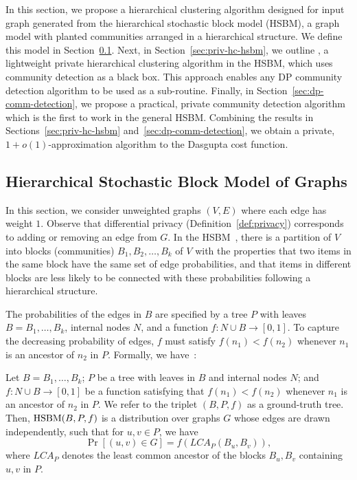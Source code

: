 
In this section, we propose a hierarchical clustering algorithm designed for input graph generated from the hierarchical stochastic block model (HSBM), a graph model with planted communities arranged in a hierarchical structure. We define this model in Section~\ref{sec:hsbm-setup}. Next, in Section~\ref{sec:priv-hc-hsbm}, we outline \dphcblocks{}, a lightweight private hierarchical clustering algorithm in the HSBM, which uses community detection as a black box. This approach enables any DP community detection algorithm to be used as a sub-routine. Finally, in Section~\ref{sec:dp-comm-detection}, we propose a practical, private community detection algorithm which is the first to work in the general HSBM. Combining the results in Sections~\ref{sec:priv-hc-hsbm} and~\ref{sec:dp-comm-detection}, we obtain a private, $1+o(1)$-approximation algorithm to the Dasgupta cost function.

\subsection{Hierarchical Stochastic Block Model of Graphs}\label{sec:hsbm-setup}

In this section, we consider unweighted graphs $(V,E)$ where each edge has weight $1$. Observe that differential privacy (Definition~\ref{def:privacy}) corresponds to adding or removing an edge from $G$. In the HSBM~\citep{cohen2017hierarchical}, there is a partition of $V$ into blocks (communities) $B_1, B_2, \ldots, B_k$ of $V$ with the properties that two items in the same block have the same set of edge probabilities, and that items in different blocks are less likely to be connected with these probabilities following a hierarchical structure.

The probabilities of the edges in $B$ are specified by a tree $P$ with leaves $B = B_1, \ldots, B_k$, internal nodes $N$, and a function $f : N \cup B \rightarrow [0,1]$. To capture the decreasing probability of edges,  $f$ must satisfy $f(n_1) < f(n_2)$ whenever $n_1$ is an ancestor of $n_2$ in $P$. Formally, we have~\citep{cohen2017hierarchical}:

\begin{defn}
Let $B = B_1, \ldots, B_k$; $P$ be a tree with leaves in $B$ and internal nodes $N$; and $f: N \cup B \rightarrow [0,1]$ be a function satisfying that $f(n_1) < f(n_2)$ whenever $n_1$ is an ancestor of $n_2$ in $P$. We refer to the triplet $(B,P,f)$ as a ground-truth tree. Then, $\textnormal{HSBM}(B,P,f)$ is a distribution over graphs $G$ whose edges are drawn independently, such that for $u,v \in P$, we have 
\[
\Pr[(u,v) \in G] = f(LCA_P(B_u, B_v)),
\]
where $LCA_P$ denotes the least common ancestor of the blocks $B_u, B_v$ containing $u,v$ in $P$. 
\end{defn}

